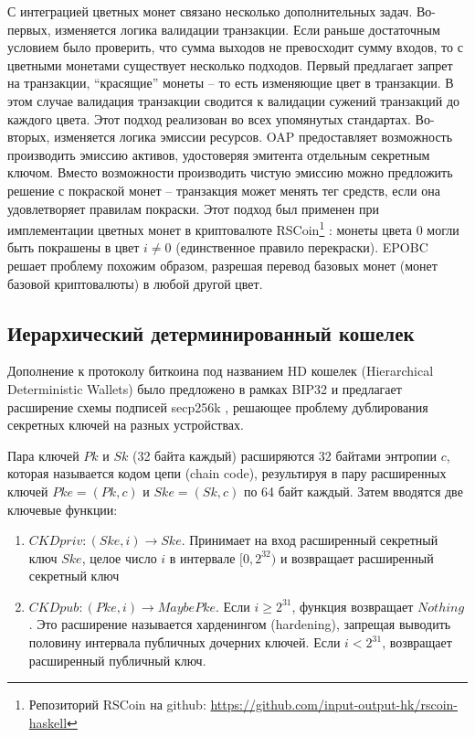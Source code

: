 \documentclass[specification,annotation]{itmo-student-thesis}
\begin{document}
С интеграцией цветных монет связано несколько дополнительных
задач. Во-первых, изменяется логика валидации транзакции. Если раньше
достаточным условием было проверить, что сумма выходов не превосходит
сумму входов, то с цветными монетами существует несколько
подходов. Первый предлагает запрет на транзакции, ``красящие'' монеты
-- то есть изменяющие цвет в транзакции. В этом случае валидация
транзакции сводится к валидации сужений транзакций до каждого
цвета. Этот подход реализован во всех упомянутых
стандартах. Во-вторых, изменяется логика эмиссии ресурсов. OAP
предоставляет возможность производить эмиссию активов, удостоверяя
эмитента отдельным секретным ключом. Вместо возможности производить
чистую эмиссию можно предложить решение с покраской монет --
транзакция может менять тег средств, если она удовлетворяет правилам
покраски. Этот подход был применен при имплементации цветных монет в
криптовалюте RSCoin\footnote{Репозиторий RSCoin на github:
  \url{https://github.com/input-output-hk/rscoin-haskell}}
\cite{danezis2015centrally}: монеты цвета $0$ могли быть покрашены в
цвет $i \neq 0$ (единственное правило перекраски). EPOBC решает
проблему похожим образом, разрешая перевод базовых монет (монет
базовой криптовалюты) в любой другой цвет.

\subsection{Иерархический детерминированный кошелек}

Дополнение к протоколу биткоина под названием HD кошелек (Hierarchical
Deterministic Wallets) было предложено в рамках BIP32 \cite{hdwallets}
и предлагает расширение схемы подписей secp256k \cite{sec20002},
решающее проблему дублирования секретных ключей на разных устройствах.

Пара ключей $Pk$ и $Sk$ (32 байта каждый) расширяются 32 байтами
энтропии $c$, которая называется кодом цепи (chain code), результируя
в пару расширенных ключей $Pke = (Pk, c)$ и $Ske = (Sk, c)$ по 64 байт
каждый. Затем вводятся две ключевые функции:

\begin{enumerate}
\item $CKDpriv : (Ske, i) \rightarrow Ske$. Принимает на вход расширенный
  секретный ключ $Ske$, целое число $i$ в интервале $[0, 2^{32})$ и
  возвращает расширенный секретный ключ
\item $CKDpub : (Pke, i) \rightarrow Maybe Pke$. Если $i \geq 2^{31}$, функция
  возвращает $Nothing$. Это расширение называется харденингом
  (hardening), запрещая выводить половину интервала публичных дочерних
  ключей. Если $i < 2^{31}$, возвращает расширенный публичный ключ.
\end{enumerate}
\end{document}
